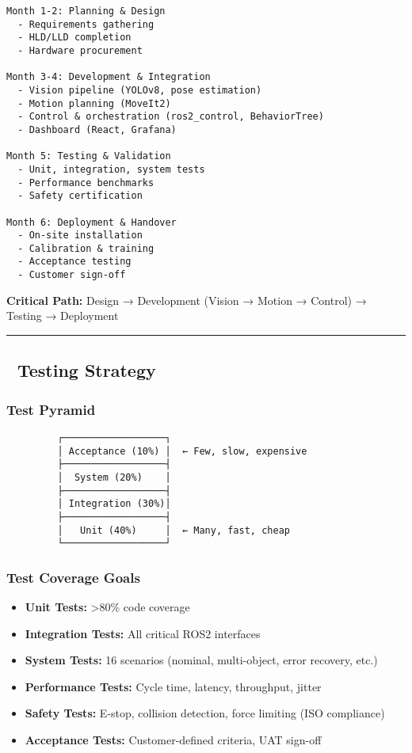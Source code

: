 \documentclass[
]{article}
\providecommand{\tightlist}{%
  \setlength{\itemsep}{0pt}\setlength{\parskip}{0pt}}
\begin{document}
\begin{verbatim}
Month 1-2: Planning & Design
  - Requirements gathering
  - HLD/LLD completion
  - Hardware procurement

Month 3-4: Development & Integration
  - Vision pipeline (YOLOv8, pose estimation)
  - Motion planning (MoveIt2)
  - Control & orchestration (ros2_control, BehaviorTree)
  - Dashboard (React, Grafana)

Month 5: Testing & Validation
  - Unit, integration, system tests
  - Performance benchmarks
  - Safety certification

Month 6: Deployment & Handover
  - On-site installation
  - Calibration & training
  - Acceptance testing
  - Customer sign-off
\end{verbatim}

\textbf{Critical Path:} Design → Development (Vision → Motion → Control)
→ Testing → Deployment

\begin{center}\rule{0.5\linewidth}{0.5pt}\end{center}

\hypertarget{testing-strategy}{%
\subsection{🧪 Testing Strategy}\label{testing-strategy}}

\hypertarget{test-pyramid}{%
\subsubsection{Test Pyramid}\label{test-pyramid}}

\begin{verbatim}
         ┌──────────────────┐
         │ Acceptance (10%) │  ← Few, slow, expensive
         ├──────────────────┤
         │  System (20%)    │
         ├──────────────────┤
         │ Integration (30%)│
         ├──────────────────┤
         │   Unit (40%)     │  ← Many, fast, cheap
         └──────────────────┘
\end{verbatim}

\hypertarget{test-coverage-goals}{%
\subsubsection{Test Coverage Goals}\label{test-coverage-goals}}

\begin{itemize}
\tightlist
\item
  \textbf{Unit Tests:} \textgreater80\% code coverage
\item
  \textbf{Integration Tests:} All critical ROS2 interfaces
\item
  \textbf{System Tests:} 16 scenarios (nominal, multi-object, error
  recovery, etc.)
\item
  \textbf{Performance Tests:} Cycle time, latency, throughput, jitter
\item
  \textbf{Safety Tests:} E-stop, collision detection, force limiting
  (ISO compliance)
\item
  \textbf{Acceptance Tests:} Customer-defined criteria, UAT sign-off
\end{itemize}
\end{document}
